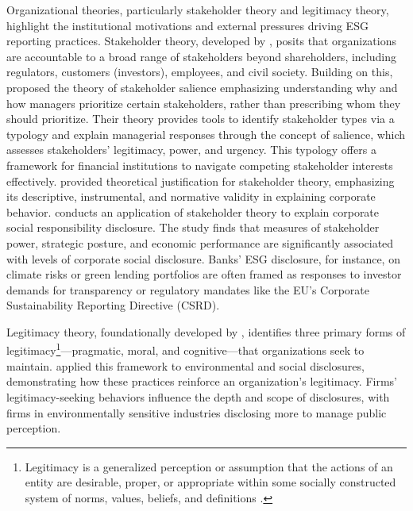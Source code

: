 \documentclass[
  authoryear]{elsarticle}
\begin{document}
Organizational theories, particularly stakeholder theory and legitimacy
theory, highlight the institutional motivations and external pressures
driving ESG reporting practices. Stakeholder theory, developed by
\citet{FREEMAN1984}, posits that organizations are accountable to a
broad range of stakeholders beyond shareholders, including regulators,
customers (investors), employees, and civil society. Building on this,
\citet{MITCHELL1997} proposed the theory of stakeholder salience
emphasizing understanding why and how managers prioritize certain
stakeholders, rather than prescribing whom they should prioritize. Their
theory provides tools to identify stakeholder types via a typology and
explain managerial responses through the concept of salience, which
assesses stakeholders' legitimacy, power, and urgency. This typology
offers a framework for financial institutions to navigate competing
stakeholder interests effectively. \citet{DONALDSON1995} provided
theoretical justification for stakeholder theory, emphasizing its
descriptive, instrumental, and normative validity in explaining
corporate behavior. \citet{ROBERTS1992} conducts an application of
stakeholder theory to explain corporate social responsibility
disclosure. The study finds that measures of stakeholder power,
strategic posture, and economic performance are significantly associated
with levels of corporate social disclosure. Banks' ESG disclosure, for
instance, on climate risks or green lending portfolios are often framed
as responses to investor demands for transparency or regulatory mandates
like the EU's Corporate Sustainability Reporting Directive (CSRD).

Legitimacy theory, foundationally developed by \citet{SUCHMAN1995},
identifies three primary forms of legitimacy\footnote{Legitimacy is a
  generalized perception or assumption that the actions of an entity are
  desirable, proper, or appropriate within some socially constructed
  system of norms, values, beliefs, and definitions
  \citep{GINZEL2004, NEILSEN1987, PERROW1970}.}---pragmatic, moral, and
cognitive---that organizations seek to maintain. \citet{DEEGAN2002}
applied this framework to environmental and social disclosures,
demonstrating how these practices reinforce an organization's
legitimacy. Firms' legitimacy-seeking behaviors influence the depth and
scope of disclosures, with firms in environmentally sensitive industries
disclosing more to manage public perception.
\end{document}
